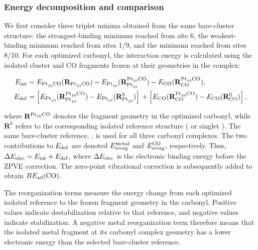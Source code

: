 \subsubsection{Energy decomposition and \texorpdfstring{}{Pt10} comparison}
\label{subsec:interaction_fragment_reorganization}

We first consider three triplet  minima obtained from the same
bare-cluster structure: the strongest-binding minimum reached from site 6, the
weakest-binding minimum reached from sites 1/9, and the minimum reached from
sites 8/10. For each optimized carbonyl, the interaction energy is calculated using the isolated cluster and CO fragments frozen at their geometries in the complex:

\begin{align}
E_{\mathrm{int}} &=
E_{\ce{Pt10CO}}(\mathbf R_{\ce{Pt10CO}})
-E_{\ce{Pt10}}(\mathbf R_{\ce{Pt10}}^{\ce{Pt10CO}})
-E_{\ce{CO}}(\mathbf R_{\ce{CO}}^{\ce{Pt10CO}}),\\
E_{\mathrm{def}} &=
\left[
E_{\ce{Pt10}}(\mathbf R_{\ce{Pt10}}^{\ce{Pt10CO}})
-E_{\ce{Pt10}}(\mathbf R_{\ce{Pt10}}^{0})
\right]
{}+
\left[
E_{\ce{CO}}(\mathbf R_{\ce{CO}}^{\ce{Pt10CO}})
-E_{\ce{CO}}(\mathbf R_{\ce{CO}}^{0})
\right],
\label{eq:tfg_deformation}
\end{align}

where $\mathbf R^{\ce{Pt10CO}}$ denotes the fragment geometry in the optimized carbonyl, while $\mathbf R^0$ refers to the corresponding isolated reference structure ( or singlet ). {The same bare-cluster reference, , is used for all three carbonyl complexes.} The two contributions to $E_{\rm def}$ are denoted $E_{\rm reorg}^{\rm metal}$      and $E_{\rm reorg}^{\ce{CO}}$, respectively. Thus, $\Delta E_{\rm elec}=E_{\rm int}+E_{\rm def}$, where $\Delta E_{\rm elec}$ is the electronic binding energy before the ZPVE correction. The zero-point vibrational correction is subsequently added to obtain $BE_{\rm ad}(\ce{CO})$.

The reorganization terms measure the energy change from each optimized isolated reference to the frozen fragment geometry in the carbonyl. Positive values indicate destabilization relative to that reference, and negative values indicate stabilization. A negative metal reorganization term therefore means that the isolated metal fragment at its carbonyl complex geometry has a lower electronic energy than the selected bare-cluster reference.

